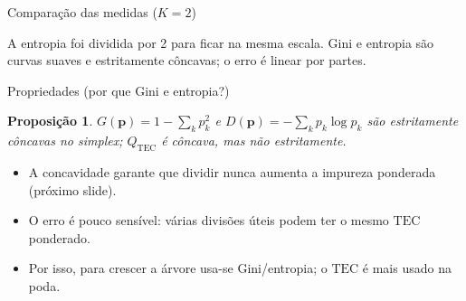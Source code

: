 \documentclass[aspectratio=169]{beamer}
\newtheorem{proposition}[theorem]{Proposição}
\newcommand{\Q}{Q}
\newcommand{\TEC}{\mathrm{TEC}}
\begin{document}
\begin{frame}{Comparação das medidas ($K=2$)}
\centering
{}

{\footnotesize A entropia foi dividida por 2 para ficar na mesma escala. Gini e entropia são curvas suaves e estritamente côncavas; o erro é linear por partes.}
\end{frame}

\begin{frame}{Propriedades (por que Gini e entropia?)}
\begin{proposition}
$G(\mathbf p)=1-\sum_k p_k^2$ e $D(\mathbf p)=-\sum_k p_k\log p_k$ são \alert{estritamente côncavas} no simplex; $\Q_{\TEC}$ é côncava, mas não estritamente.
\end{proposition}

\begin{itemize}
  \item A concavidade garante que dividir nunca \alert{aumenta} a impureza ponderada (próximo slide).
  \item O erro é pouco sensível: várias divisões úteis podem ter o mesmo $\TEC$ ponderado.
  \item Por isso, para \alert{crescer} a árvore usa-se Gini/entropia; o $\TEC$ é mais usado na \alert{poda}.
\end{itemize}
\end{frame}
\end{document}
